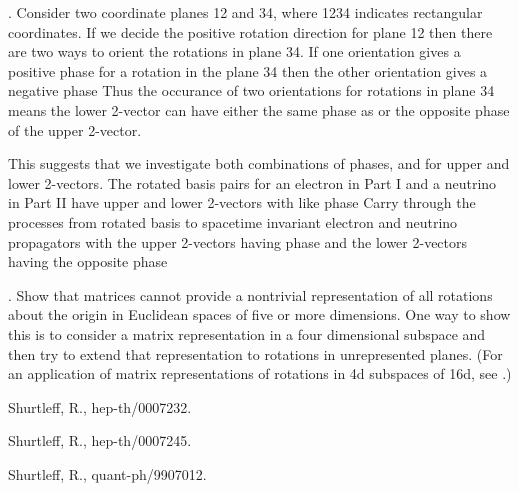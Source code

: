 \documentclass[a4paper,12pt]{article}
\begin{document}
 
\pagebreak


\vspace{0.3cm}


. Consider two coordinate planes 12 and 34, where 1234 indicates rectangular coordinates. If we decide the positive rotation direction for plane 12 then there are two ways to orient the rotations in plane 34. If one orientation gives a positive phase \coordHE{} for a rotation in the plane 34 then the other orientation gives a negative phase \coordHE{} Thus the occurance of two orientations for rotations in plane 34 means the lower 2-vector can have either the same phase as or the opposite phase of the upper 2-vector. 

	This suggests that we investigate both combinations of phases, \myHighlight{$++$}\coordHE{} and \myHighlight{$+-,$}\coordHE{} for upper and lower 2-vectors. The rotated basis pairs for an electron in Part I and a neutrino in Part II have upper and lower 2-vectors with like phase \coordHE{} Carry through the processes from rotated basis to spacetime invariant electron and neutrino propagators with the upper 2-vectors having phase \coordHE{} and the lower 2-vectors having the opposite phase \coordHE{}

\vspace{0.3cm}

. Show that \coordHE{} matrices cannot provide a nontrivial representation of all rotations about the origin in Euclidean spaces of five or more dimensions. One way to show this is to consider a \coordHE{} matrix representation in a four dimensional subspace and then try to extend that representation to rotations in unrepresented planes. (For an application of \coordHE{} matrix representations of rotations in 4d subspaces of 16d, see \cite{16d}.)

\begin{thebibliography}{9}

 Shurtleff, R., hep-th/0007232.

 Shurtleff, R., hep-th/0007245.

 Shurtleff, R., quant-ph/9907012.

\end{thebibliography}
\end{document}
